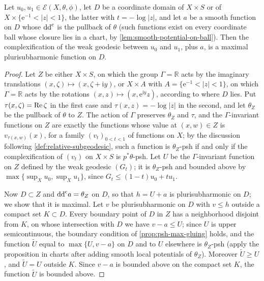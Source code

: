\begin{lemma}\label{lem:perron-complexification-maximal}
Let $u_0,u_1\in\mathcal E(X,\theta,\phi)$, let $D$ be a coordinate domain of $X\times S$ or of $X\times\{\mathrm e^{-1}<|z|<1\}$, the latter with $t=-\log|z|$, and let $a$ be a smooth function on $D$ whose $\mathrm{dd}^{\mathrm{c}}$ is the pullback of $\theta$ (such functions exist on every coordinate ball whose closure lies in a chart, by \cref{lem:smooth-potential-on-ball}). Then the complexification of the weak geodesic between $u_0$ and $u_1$, plus $a$, is a maximal plurisubharmonic function on $D$.
\end{lemma}
\begin{proof}
Let $Z$ be either $X\times S$, on which the group $\Gamma=\mathbb R$ acts by the imaginary translations $(x,\zeta)\mapsto(x,\zeta+\mathrm iy)$, or $X\times A$ with $A=\{\mathrm e^{-1}<|z|<1\}$, on which $\Gamma=\mathbb R$ acts by the rotations $(x,z)\mapsto(x,\mathrm e^{\mathrm iy}z)$, according to where $D$ lies. Put $\tau(x,\zeta)=\operatorname{Re}\zeta$ in the first case and $\tau(x,z)=-\log|z|$ in the second, and let $\theta_Z$ be the pullback of $\theta$ to $Z$. The action of $\Gamma$ preserves $\theta_Z$ and $\tau$, and the $\Gamma$-invariant functions on $Z$ are exactly the functions whose value at $(x,w)\in Z$ is $v_{\tau(x,w)}(x)$, for a family $(v_t)_{0<t<1}$ of functions on $X$; by the discussion following \cref{def:relative-subgeodesic}, such a function is $\theta_Z$-psh if and only if the complexification of $(v_t)$ on $X\times S$ is $p^*\theta$-psh. Let $U$ be the $\Gamma$-invariant function on $Z$ defined by the weak geodesic $(G_t)$; it is $\theta_Z$-psh and bounded above by $\max\{\sup_Xu_0,\sup_Xu_1\}$, since $G_t\leq(1-t)u_0+tu_1$.

Now $D\subset Z$ and $\mathrm{dd}^{\mathrm{c}} a=\theta_Z$ on $D$, so that $h=U+a$ is plurisubharmonic on $D$; we show that it is maximal. Let $v$ be plurisubharmonic on $D$ with $v\leq h$ outside a compact set $K\subset D$. Every boundary point of $D$ in $Z$ has a neighborhood disjoint from $K$, on whose intersection with $D$ we have $v-a\leq U$; since $U$ is upper semicontinuous, the boundary condition of \cref{prop:psh-max-gluing} holds, and the function $\widetilde U$ equal to $\max\{U,v-a\}$ on $D$ and to $U$ elsewhere is $\theta_Z$-psh (apply the proposition in charts after adding smooth local potentials of $\theta_Z$). Moreover $\widetilde U\geq U$, and $\widetilde U=U$ outside $K$. Since $v-a$ is bounded above on the compact set $K$, the function $\widetilde U$ is bounded above.


\end{proof}
